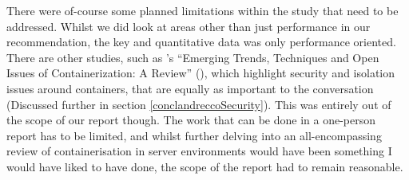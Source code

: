 There were of-course some planned limitations within the study that need to be addressed. Whilst we did look at areas other than just performance in our recommendation, the key and quantitative data was only performance oriented. There are other studies, such as \citeauthor{watanda19}'s “Emerging Trends, Techniques and Open Issues of Containerization: A Review” (\citeyear{watanda19}), which highlight security and isolation issues around containers, that are equally as important to the conversation (Discussed further in section \ref{conclandreccoSecurity}). This was entirely out of the scope of our report though. The work that can be done in a one-person report has to be limited, and whilst further delving into an all-encompassing review of containerisation in server environments would have been something I would have liked to have done, the scope of the report had to remain reasonable.




